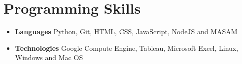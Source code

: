 \documentclass[letterpaper,11pt]{article}
\begin{document}
\section{Programming Skills}
 \begin{itemize}\setlength\itemsep{-3pt}
   \item \textbf{Languages} Python, Git, HTML, CSS, JavaScript, NodeJS and MASAM
   \item \textbf{Technologies} Google Compute Engine, Tableau, Microsoft Excel, Linux, Windows and Mac OS
\end{itemize}\vspace{-6pt}


\end{document}
